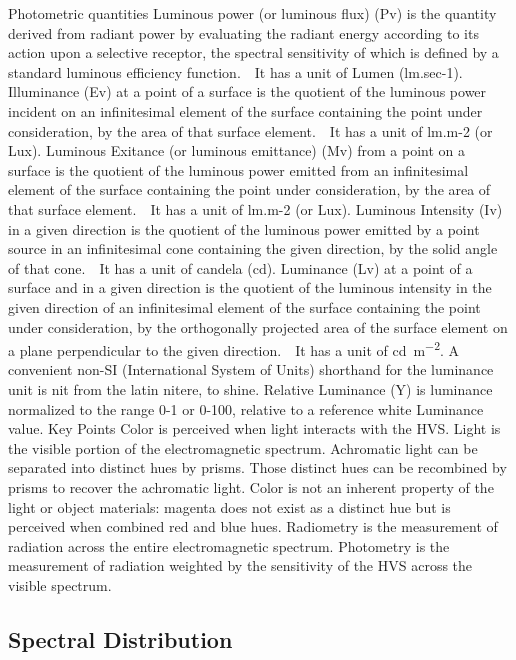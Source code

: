 Photometric quantities
Luminous power (or luminous flux) (Pv) is the quantity derived from radiant power by evaluating the radiant energy according to its action upon a selective receptor, the spectral sensitivity of which is defined by a standard luminous efficiency function.   It has a unit of Lumen (lm.sec-1).
Illuminance (Ev) at a point of a surface is the quotient of the luminous power incident on an infinitesimal element of the surface containing the point under consideration, by the area of that surface element.   It has a unit of lm.m-2 (or Lux).
Luminous Exitance (or luminous emittance) (Mv) from a point on a surface is the quotient of the luminous power emitted from an infinitesimal element of the surface containing the point under consideration, by the area of that surface element.   It has a unit of lm.m-2 (or Lux).
Luminous Intensity (Iv) in a given direction is the quotient of the luminous power emitted by a point source in an infinitesimal cone containing the given direction, by the solid angle of that cone.   It has a unit of candela (cd).
Luminance (Lv) at a point of a surface and in a given direction is the quotient of the luminous intensity in the given direction of an infinitesimal element of the surface containing the point under consideration, by the orthogonally projected area of the surface element on a plane perpendicular to the given direction.   It has a unit of \si{\candela\per\meter\squared}. A convenient non-SI (International System of Units) shorthand for the luminance unit is nit from the latin nitere, to shine.
Relative Luminance (Y) is luminance normalized to the range 0-1 or 0-100, relative to a reference white Luminance value.
Key Points
Color is perceived when light interacts with the HVS.
Light is the visible portion of the electromagnetic spectrum.
Achromatic light can be separated into distinct hues by prisms. Those distinct hues can be recombined by prisms to recover the achromatic light.
Color is not an inherent property of the light or object materials:  magenta does not exist as a distinct hue but is perceived when combined red and blue hues.
Radiometry is the measurement of radiation across the entire electromagnetic spectrum.
Photometry is the measurement of radiation weighted by the sensitivity of the HVS across the visible spectrum.

\subsection{Spectral Distribution}%
\label{subsec:spectral-distribution}

